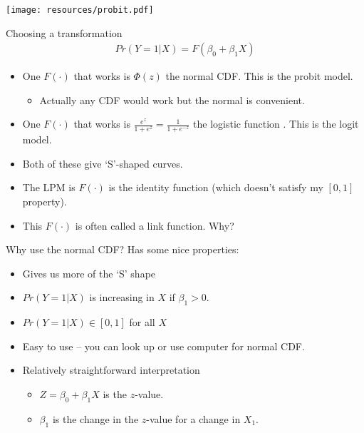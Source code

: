 \documentclass[aspectratio=169]{beamer}
\begin{document}
\begin{frame}
\begin{center}
\texttt{[image: resources/probit.pdf]}
\end{center}
\end{frame}

\begin{frame}{Choosing a transformation}
\begin{eqnarray*}
Pr(Y=1 | X) = F(\beta_0 + \beta_1 X)
\end{eqnarray*}
\begin{itemize}
\item One $F(\cdot)$ that works is $\Phi(z)$ the normal CDF. This is the \alert{probit} model.
\begin{itemize}
\item Actually any CDF would work but the normal is convenient.
\end{itemize}
\item One $F(\cdot)$ that works is $\frac{e^z}{1+ e^z}=\frac{1}{1+e^{-z}}$ the logistic function . This is the \alert{logit} model.
\item Both of these give `S'-shaped curves.
\item The LPM is $F(\cdot)$ is the \alert{identity function} (which doesn't satisfy my $[0,1]$ property).
\item This $F(\cdot)$ is often called a \alert{link function}. Why?
\end{itemize}
\end{frame}


\begin{frame}{Why use the normal CDF?}
Has some nice properties:
\begin{itemize}
\item Gives us more of the `S' shape
\item $Pr(Y=1|X)$ is increasing in $X$ if $\beta_1>0$.
\item $Pr(Y=1|X) \in [0,1]$ for all $X$
\item Easy to use -- you can look up or use computer for normal CDF.
\item Relatively straightforward interpretation
\begin{itemize}
\item $Z=\beta_0 + \beta_1 X$ is the $z$-value.
\item $\beta_1$ is the change in the $z$-value for a change in $X_1$.
\end{itemize}
\end{itemize}
\end{frame}
\end{document}
